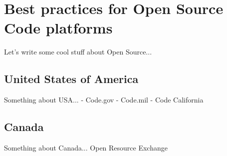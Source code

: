 \section{Best practices for Open Source Code platforms}

Let's write some cool stuff about Open Source...

\subsection{United States of America}

Something about USA...
- Code.gov
- Code.mil
- Code California


\subsection{Canada}

Something about Canada... Open Resource Exchange